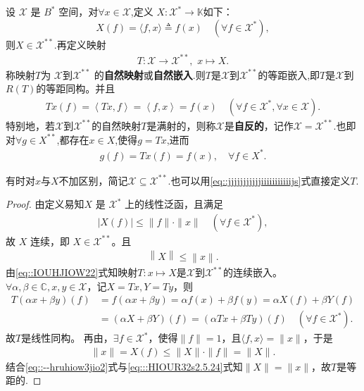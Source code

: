 \documentclass[../../main.tex]{subfiles}%
\begin{document}
\begin{theorem}\label{theorem:原空间可等距嵌入第二共轭空间}
设 $\mathscr{X}$ 是 $B^*$ 空间，对$\forall x \in \mathscr{X}$,定义 $X : \mathscr{X}^* \to \mathbb{K}$如下：
\[
X(f) = \langle f, x \rangle\triangleq f(x) \quad (\forall f \in \mathscr{X}^*),
\]
则$X \in \mathscr{X}^{**}$.再定义映射
\begin{align*}
T : \mathscr{X} \to \mathscr{X}^{**},\,\,x\mapsto X.
\end{align*}
称映射$T$为 $\mathscr{X}$到$\mathscr{X}^{**}$ 的\textbf{自然映射}或\textbf{自然嵌入}.则$T$是$\mathscr{X}$到$\mathscr{X}^{**}$的等距嵌入,即$T$是$\mathscr{X}$到$R(T)$的等距同构。并且
\begin{align}\label{eq::jjjjjjjjjjjiiiiiiiiiiijs}
Tx\left( f \right) =\left<Tx,f \right> =\left< f,x \right> =f\left( x \right) \quad \left( \forall f\in \mathscr{X} ^*,\forall x\in \mathscr{X} \right) .
\end{align}
特别地，若$\mathscr{X}$到$\mathscr{X}^{**}$的自然映射$T$是满射的，则称$\mathscr{X}$是\textbf{自反的}，记作$\mathscr{X}=\mathscr{X}^{**}$.也即对$\forall g\in X^{**}$,都存在$x\in X$,使得$g=Tx$,进而
\begin{align*}
g(f)=Tx(f)=f(x),\quad \forall f\in X^*.
\end{align*}
\end{theorem}
\begin{remark}
有时对$x$与$X$不加区别，简记$\mathscr{X}\subseteq\mathscr{X}^{**}$.也可以用\eqref{eq::jjjjjjjjjjjiiiiiiiiiiijs}式直接定义$T$.
\end{remark}
\begin{proof}
由定义易知$X$ 是 $\mathscr{X}^*$ 上的线性泛函，且满足
\begin{align}\label{eq::IOUHJIOW22}
|X(f)| \leqslant \|f\| \cdot \|x\| \quad (\forall f \in \mathscr{X}^*),
\end{align}
故 $X$ 连续，即 $X \in \mathscr{X}^{**}$。且
\begin{align}\label{eq::--hruhiow3jio2}
\left\| X \right\| \leqslant \left\| x \right\| .
\end{align}
由\eqref{eq::IOUHJIOW22}式知映射$T:x\mapsto X$是$\mathscr{X}$到$\mathscr{X}^{**}$的连续嵌入。$\forall \alpha,\beta\in\mathbb{C},x,y\in\mathscr{X}$，记$X=Tx,Y=Ty$，则
\begin{align*}
T(\alpha x+\beta y)(f)&=f(\alpha x+\beta y)
=\alpha f(x)+\beta f(y)=\alpha X(f)+\beta Y(f)\\
&=(\alpha X+\beta Y)(f)=(\alpha Tx+\beta Ty)(f)\quad (\forall f\in\mathscr{X}^*).
\end{align*}
故$T$是线性同构。
再由，$\exists f\in\mathscr{X}^*$，使得$\|f\|=1$，且$\langle f,x\rangle=\|x\|$，于是
\begin{align}
\|x\|=X(f)\leqslant\|X\|\cdot\|f\|=\|X\|. \label{eq:::HIOUR32s2.5.24}
\end{align}
结合\eqref{eq::--hruhiow3jio2}式与\eqref{eq:::HIOUR32s2.5.24}式知$\|X\|=\|x\|$，故$T$是等距的.
\end{proof}
\end{document}
